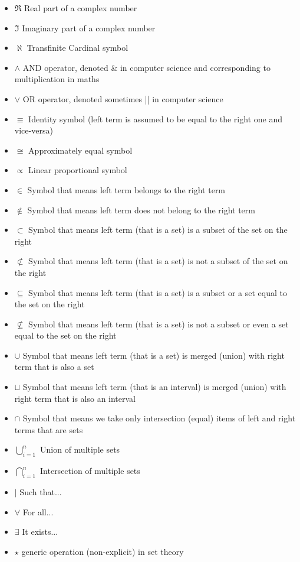 \documentclass[12pt,a4paper,twoside,openright]{report}
\theoremstyle{definition}
\theoremstyle{itexmp}
\numberwithin{equation}{section}
\begin{document}
\begin{itemize}[label={},leftmargin=0.5cm]
	 	\item $\Re$ Real part of a complex number
	 	\item $\Im$ Imaginary part of a complex number
	 	\item $\aleph$ Transfinite Cardinal symbol
	 	\item $\wedge$ AND operator, denoted \& in computer science and corresponding to multiplication in maths
	 	\item $\vee$ OR operator, denoted sometimes || in computer science
	 	\item $\equiv$ Identity symbol (left term is assumed to be equal to the right one and vice-versa)
	 	\item $\cong$ Approximately equal symbol
	 	\item $\propto$ Linear proportional symbol 
	 	\item $\in$ Symbol that means left term belongs to the right term
	 	\item $\not\in$ Symbol that means left term does not belong to the right term
	 	\item $\subset$ Symbol that means left term (that is a set) is a subset of the set on the right 
	 	\item $\not\subset$ Symbol that means left term (that is a set) is not a subset of the set on the right
	 	\item $\subseteq$ Symbol that means left term (that is a set) is a subset or a set equal to the set on the right
	 	\item $\not\subseteq$ Symbol that means left term (that is a set) is not a subset or even a set equal to the set on the right
	 	\item $\cup$ Symbol that means left term (that is a set) is merged (union) with right term that is also a set
	 	\item $\sqcup$ Symbol that means left term (that is an interval) is merged (union) with right term that is also an interval
	 	\item $\cap$ Symbol that means we take only intersection (equal) items of left and right terms that are sets
	 	\item $\displaystyle \bigcup_{i=1}^n$ Union of multiple sets
	 	\item $\displaystyle \bigcap_{i=1}^n$ Intersection of multiple sets
	 	\item $\mid$ Such that...
	 	\item $\forall$ For all...
	 	\item $\exists$ It exists...
	 	\item $\star$ generic operation (non-explicit) in set theory

\end{itemize}
\end{document}
